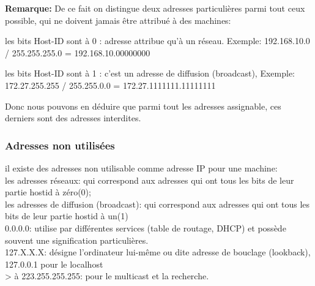 \textbf{Remarque:}
De ce fait on distingue deux adresses particulières parmi tout ceux possible,
qui ne doivent jamais être attribué à des machines:

     les bits Host-ID sont à 0 : adresse attribue qu’à un réseau.
Exemple: 192.168.10.0 / 255.255.255.0 = 192.168.10.00000000

    les bits Host-ID sont à 1 : c’est un adresse de  diffusion (broadcast),
Exemple: 172.27.255.255 / 255.255.0.0 = 172.27.1111111.11111111

Donc nous pouvons en déduire que parmi tout les adresses assignable, ces
derniers sont des adresses interdites.



\subsubsection{Adresses non utilisées}
il existe des adresses non utilisable comme adresse IP pour une machine:\\
les adresses réseaux: qui correspond aux adresses qui ont tous les bits de
leur partie hostid à zéro(0);\\
les adresses de diffusion (broadcast): qui correspond aux adresses qui ont
tous les bits de leur partie hostid à un(1)\\
0.0.0.0: utilise par différentes services (table de routage, DHCP) et possède
souvent une signification particulières. \\
127.X.X.X: désigne l’ordinateur lui-même ou dite adresse de bouclage
(lookback), 127.0.0.1 pour le localhost\\
> à 223.255.255.255: pour le multicast et la recherche.\\


